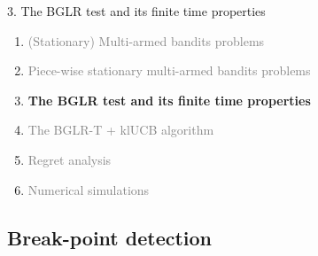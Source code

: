 \documentclass[11pt,english,ignorenonframetext,]{beamer}
\begin{document}
\begin{frame}{3. The BGLR test and its finite time properties}

  \begin{enumerate}
    \item
    \textcolor{gray}{
      (Stationary) Multi-armed bandits problems
    }
    \vspace*{15pt}

    \item
    \textcolor{gray}{
      Piece-wise stationary multi-armed bandits problems
    }
    \vspace*{15pt}

    \item
    \alert{\textbf{%
      The BGLR test and its finite time properties
    }}
    \vspace*{15pt}

    \item
    \textcolor{gray}{
      The BGLR-T + klUCB algorithm
    }
    \vspace*{15pt}

    \item
    \textcolor{gray}{
      Regret analysis
    }
    \vspace*{15pt}

    \item
    \textcolor{gray}{
      Numerical simulations
    }
  \end{enumerate}

\end{frame}


\subsection{\hfill{}Break-point detection\hfill{}}
\end{document}
